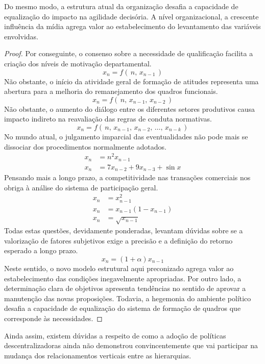 \documentclass[fleqn]{icat-ufal}
\begin{document}
\begin{teorema}
  Do mesmo modo, a estrutura atual da organização desafia a capacidade de
  equalização do impacto na agilidade decisória. A nível organizacional, a
  crescente influência da mídia agrega valor ao estabelecimento do levantamento
  das variáveis envolvidas.
\end{teorema}
\begin{proof}
  Por conseguinte, o consenso sobre a necessidade de qualificação facilita a
  criação dos níveis de motivação departamental.
  \[ x_n = f(\,n,\,x_{n-1} \,)                            \]
  Não obstante, o início da atividade geral de formação de atitudes representa
  uma abertura para a melhoria do remanejamento dos quadros funcionais.
  \[ x_n = f(\,n,\,x_{n-1},\,x_{n-2} \,)                  \]
  Não obstante, o aumento do diálogo entre os diferentes setores produtivos
  causa impacto indireto na reavaliação das regras de conduta normativas.
  \[ x_n = f(\,n,\,x_{n-1},\,x_{n-2},\,\dots,\,x_{n-k}\,) \]
  No mundo atual, o julgamento imparcial das eventualidades não pode mais se
  dissociar dos procedimentos normalmente adotados.
  \begin{align*}
          x_n & = n^2x_{n-1}               \\
          x_n & = 7x_{n-2}+9x_{n-3}+\sin x
  \end{align*}
  Pensando mais a longo prazo, a competitividade nas transações comerciais nos
  obriga à análise do sistema de participação geral.
  \begin{align*}
          x_n & = x_{n-1}^2          \\
          x_n & = x_{n-1}(1-x_{n-1}) \\
          x_n & = \sqrt{x_{n-1}}
  \end{align*}
  Todas estas questões, devidamente ponderadas, levantam dúvidas sobre se a
  valorização de fatores subjetivos exige a precisão e a definição do retorno
  esperado a longo prazo.
  \[ x_n = (1+\alpha) x_{n-1} \]
  Neste sentido, o novo modelo estrutural aqui preconizado agrega valor ao
  estabelecimento das condições inegavelmente apropriadas.  Por outro lado, a
  determinação clara de objetivos apresenta tendências no sentido de aprovar a
  manutenção das novas proposições.  Todavia, a hegemonia do ambiente político
  desafia a capacidade de equalização do sistema de formação de quadros que
  corresponde às necessidades.
\end{proof}

Ainda assim, existem dúvidas a respeito de como a adoção de políticas
descentralizadoras ainda não demonstrou convincentemente que vai participar na
mudança dos relacionamentos verticais entre as hierarquias.
\end{document}
